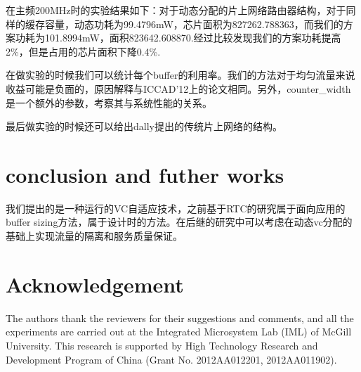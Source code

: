 ﻿\documentclass[10pt,journal]{IEEEtran}
\begin{document}
在主频200MHz时的实验结果如下：对于动态分配的片上网络路由器结构，对于同样的缓存容量，动态功耗为99.4796mW，芯片面积为827262.788363，而我们的方案功耗为101.8994mW，面积823642.608870.经过比较发现我们的方案功耗提高2\%，但是占用的芯片面积下降0.4\%.

在做实验的时候我们可以统计每个buffer的利用率。我们的方法对于均匀流量来说收益可能是负面的，原因解释与ICCAD'12上的论文相同。另外，counter\_width是一个额外的参数，考察其与系统性能的关系。

最后做实验的时候还可以给出dally提出的传统片上网络的结构。

\section{conclusion and futher works}\label{conc}
我们提出的是一种运行的VC自适应技术，之前基于RTC的研究属于面向应用的buffer sizing方法，属于设计时的方法。在后继的研究中可以考虑在动态vc分配的基础上实现流量的隔离和服务质量保证。

\section*{Acknowledgement}
The authors thank the reviewers for their suggestions and comments, and all the experiments are carried out at the Integrated Microsystem Lab (IML) of McGill University. This research is supported by High Technology Research and Development Program of China (Grant No. 2012AA012201, 2012AA011902).



\end{document}
